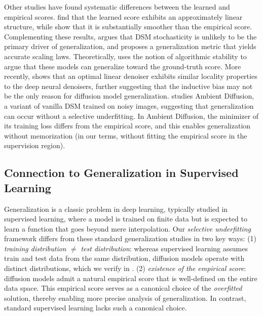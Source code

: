 Other studies have found systematic differences between the learned and empirical scores. \citet{wang2024unreasonable,li2024understanding} find that the learned score exhibits an approximately linear structure, while \citet{chen2025interpolation,wang2024on} show that it is substantially smoother than the empirical score. Complementing these results, \citet{bertrand2025closed} argues that DSM stochasticity is unlikely to be the primary driver of generalization, and \citet{zhang2025understanding} proposes a generalization metric that yields accurate scaling laws. Theoretically, \citet{farghly2025implicit} uses the notion of algorithmic stability to argue that these models can generalize toward the ground-truth score. More recently, \citet{lukoianov2025locality} shows that an optimal
linear denoiser exhibits similar locality properties to the deep neural
denoisers, further suggesting that the inductive bias may not be the only reason for diffusion model generalization. \citet{shah2025does} studies Ambient Diffusion, a variant of vanilla DSM trained on noisy images, suggesting that generalization can occur without a selective underfitting. In Ambient Diffusion, the minimizer of its training loss differs from the empirical score, and this enables generalization without memorization (in our terms, without fitting the empirical score in the supervision region).

\subsection{Connection to Generalization in Supervised Learning} \label{app:generalization}

Generalization is a classic problem in deep learning, typically studied in supervised learning, where a model is trained on finite data but is expected to learn a function that goes beyond mere interpolation. Our \emph{selective underfitting} framework differs from these standard generalization studies in two key ways: (1) \emph{training distribution $\neq$ test distribution}: whereas supervised learning assumes train and test data from the same distribution, diffusion models operate with distinct distributions, which we verify in . (2) \emph{existence of the empirical score}: diffusion models admit a natural empirical score that is well-defined on the entire data space. This empirical score serves as a canonical choice of the \emph{overfitted} solution, thereby enabling more precise analysis of generalization. In contrast, standard supervised learning lacks such a canonical choice.

